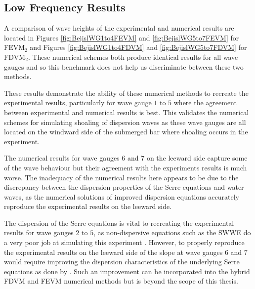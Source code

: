 \subsection{Low Frequency Results}
A comparison of wave heights of the experimental and numerical results are located in Figures \ref{fig:BejislWG1to4FEVM} and \ref{fig:BejislWG5to7FEVM} for $\text{FEVM}_2$ and Figures \ref{fig:BejislWG1to4FDVM} and \ref{fig:BejislWG5to7FDVM} for $\text{FDVM}_2$. These numerical schemes both produce identical results for all wave gauges and so this benchmark does not help us discriminate between these two methods. 

These results demonstrate the ability of these numerical methods to recreate the experimental results, particularly for wave gauge $1$ to $5$ where the agreement between experimental and numerical results is best. This validates the numerical schemes for simulating shoaling of dispersion waves as these wave gauges are all located on the windward side of the submerged bar where shoaling occurs in the experiment. 

The numerical results for wave gauges $6$ and $7$ on the leeward side capture some of the wave behaviour but their agreement with the experiments results is much worse. The inadequacy of the numerical results here appears to be due to the discrepancy between the dispersion properties of the Serre equations and water waves, as the numerical solutions of improved dispersion equations \cite{Beji-Battjes-1994-1,Lannes-2013} accurately reproduce the experimental results on the leeward side.

The dispersion of the Serre equations is vital to recreating the experimental results for wave gauges $2$ to $5$, as non-dispersive equations such as the SWWE do a very poor job at simulating this experiment \cite{Pitt-2017-1725}. However, to properly reproduce the experimental results on the leeward side of the slope at wave gauges $6$ and $7$  would require improving the dispersion characteristics of the underlying Serre equations as done by \citet{Barthelemy-2004-315}. Such an improvement can be incorporated into the hybrid FDVM and FEVM numerical methods \cite{Zoppou-2014} but is beyond the scope of this thesis. 

